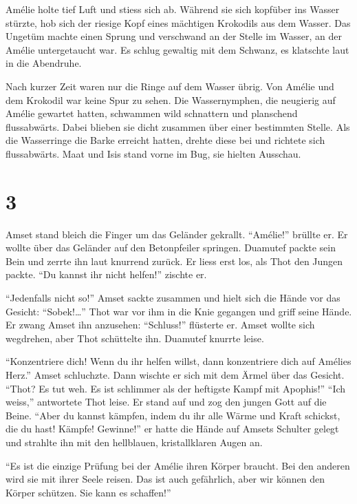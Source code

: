 \documentclass[11pt,titlepage,a5paper]{book}
\begin{document}
Amélie holte tief Luft und stiess sich ab. Während sie sich kopfüber ins Wasser stürzte, hob sich der riesige Kopf eines mächtigen Krokodils aus dem Wasser. Das Ungetüm machte einen Sprung und verschwand an der Stelle im Wasser, an der Amélie untergetaucht war. Es schlug gewaltig mit dem Schwanz, es klatschte laut in die Abendruhe. 

Nach kurzer Zeit waren nur die Ringe auf dem Wasser übrig. Von Amélie und dem Krokodil war keine Spur zu sehen. Die Wassernymphen, die neugierig auf Amélie gewartet hatten, schwammen wild schnattern und planschend flussabwärts. Dabei blieben sie dicht zusammen über einer bestimmten Stelle. Als die Wasserringe die Barke erreicht hatten, drehte diese bei und richtete sich flussabwärts. Maat und Isis stand vorne im Bug, sie hielten Ausschau.

\section*{3}

Amset stand bleich die Finger um das Geländer gekrallt. "`Amélie!"' brüllte er. Er wollte über das Geländer auf den Betonpfeiler springen. Duamutef packte sein Bein und zerrte ihn laut knurrend zurück. Er liess erst los, als Thot den Jungen packte. "`Du kannst ihr nicht helfen!"' zischte er.

"`Jedenfalls nicht so!"' Amset sackte zusammen und hielt sich die Hände vor das Gesicht: "`Sobek!\dots"' Thot war vor ihm in die Knie gegangen und griff seine Hände. Er zwang Amset ihn anzusehen: "`Schluss!"' flüsterte er. Amset wollte sich wegdrehen, aber Thot schüttelte ihn. Duamutef knurrte leise.

"`Konzentriere dich! Wenn du ihr helfen willst, dann konzentriere dich auf Amélies Herz."' Amset schluchzte. Dann wischte er sich mit dem Ärmel über das Gesicht. "`Thot? Es tut weh. Es ist schlimmer als der heftigste Kampf mit Apophis!"' "`Ich weiss,"' antwortete Thot leise. Er stand auf und zog den jungen Gott auf die Beine. "`Aber du kannst kämpfen, indem du ihr alle Wärme und Kraft schickst, die du hast! Kämpfe! Gewinne!"' er hatte die Hände auf Amsets Schulter gelegt und strahlte ihn mit den hellblauen, kristallklaren Augen an.

"`Es ist die einzige Prüfung bei der Amélie ihren Körper braucht. Bei den anderen wird sie mit ihrer Seele reisen. Das ist auch gefährlich, aber wir können den Körper schützen. Sie kann es schaffen!"'
\end{document}
